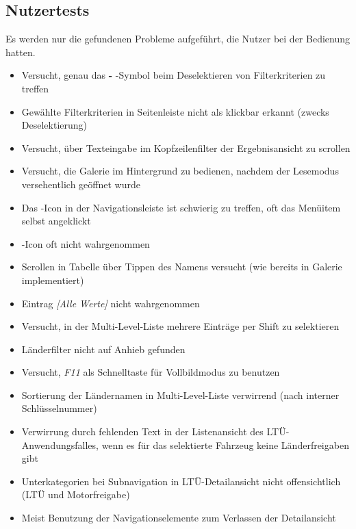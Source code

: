 \subsection{Nutzertests}
Es werden nur die gefundenen Probleme aufgeführt, die Nutzer bei der Bedienung hatten.
\begin{itemize}
 \item Versucht, genau das \textbf{-} -Symbol beim Deselektieren von Filterkriterien zu treffen
 \item Gewählte Filterkriterien in Seitenleiste nicht als klickbar erkannt (zwecks Deselektierung)
 \item Versucht, über Texteingabe im Kopfzeilenfilter der Ergebnisansicht zu scrollen
\end{itemize}
\begin{itemize}
 \item Versucht, die Galerie im Hintergrund zu bedienen, nachdem der Lesemodus versehentlich geöffnet wurde
 \item Das -Icon in der Navigationsleiste ist schwierig zu treffen, oft das Menüitem selbst angeklickt
 \item {}-Icon oft nicht wahrgenommen
 \item Scrollen in Tabelle über Tippen des Namens versucht (wie bereits in Galerie implementiert)
\end{itemize}
\begin{itemize}
 \item Eintrag \textit{[Alle Werte]} nicht wahrgenommen
 \item Versucht, in der Multi-Level-Liste mehrere Einträge per Shift zu selektieren
\end{itemize}
\begin{itemize}
 \item Länderfilter nicht auf Anhieb gefunden
 \item Versucht, \textit{F11} als Schnelltaste für Vollbildmodus zu benutzen
 \item Sortierung der Ländernamen in Multi-Level-Liste verwirrend (nach interner Schlüsselnummer)
 \item Verwirrung durch fehlenden Text in der Listenansicht des LTÜ-Anwendungsfalles, wenn es für das selektierte Fahrzeug keine Länderfreigaben gibt
 \item Unterkategorien bei Subnavigation in LTÜ-Detailansicht nicht offensichtlich (LTÜ und Motorfreigabe)
 \item Meist Benutzung der Navigationselemente zum Verlassen der Detailansicht
\end{itemize}
